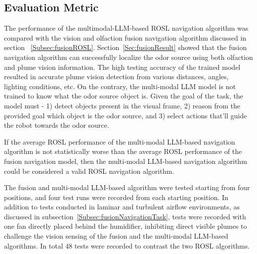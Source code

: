 

\subsection{Evaluation Metric}\label{subsec:LLMEvaluationMetric}
The performance of the multimodal-LLM-based ROSL navigation algorithm was compared with the vision and olfaction fusion navigation algorithm discussed in section ~\ref{Subsec:fusionROSL}. %
Section~\ref{Sec:fusionResult} showed that the fusion navigation algorithm can successfully localize the odor source using both olfaction and plume vision information. The high testing accuracy of the trained model resulted in accurate plume vision detection from various distances, angles, lighting conditions, etc. On the contrary, the multi-modal LLM model is not trained to know what the odor source object is. Given the goal of the task, the model must - 1) detect objects present in the visual frame, 2) reason from the provided goal which object is the odor source, and 3) select actions that'll guide the robot towards the odor source.

If the average ROSL performance of the multi-modal LLM-based navigation algorithm is not statistically worse than the average ROSL performance of the fusion navigation model, then the multi-modal LLM-based navigation algorithm could be considered a valid ROSL navigation algorithm.

The fusion and multi-modal LLM-based algorithm were tested starting from four positions, and four test runs were recorded from each starting position. In addition to tests conducted in laminar and turbulent airflow environments, as discussed in subsection~\ref{Subsec:fusionNavigationTask}, tests were recorded with one fan directly placed behind the humidifier, inhibiting direct visible plumes to challenge the vision sensing of the fusion and the multi-modal LLM-based algorithms. In total 48 tests were recorded to contrast the two ROSL algorithms.

